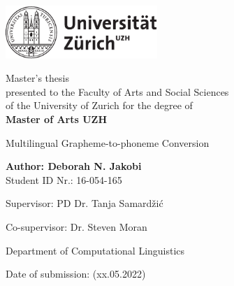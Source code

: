 \begin{titlepage}
\includegraphics[height=20mm]{images/uzh_logo_d_pos}\\

\begin{center}

{\sffamily
Master's thesis \\
presented to the Faculty of Arts and Social Sciences \\
of the University of Zurich for the degree of \\
\textbf{Master of Arts UZH} \\

\vspace{2cm}

{\Huge Multilingual Grapheme-to-phoneme Conversion}\\

\vspace{4cm}

\textbf{Author: Deborah N. Jakobi} \\
	Student ID Nr.: 16-054-165 \\

\vspace{2cm}

Supervisor: PD Dr. Tanja Samardžić 

Co-supervisor: Dr. Steven Moran 

Department of Computational Linguistics

\vfill Date of submission: (xx.05.2022)

\vspace{3cm}
}
\end{center}

\end{titlepage}

\newpage
